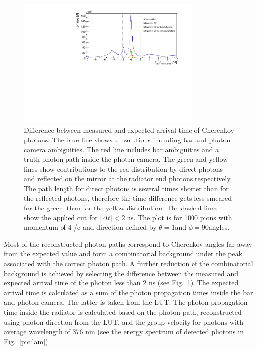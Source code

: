 \begin{figure}[!h]
\centering
\includegraphics[width=0.8\textwidth]{pics/hDiff.pdf}
\caption{\label{pic:dtime}
Difference between measured and expected arrival time of Cherenkov photons. The blue line shows all solutions including bar and photon camera ambiguities. The red line includes bar ambiguities and a truth photon path inside the photon camera. The green and yellow lines show contributions to the red distribution by direct photons and reflected on the mirror at the radiator end photons respectively. The path length for direct photons is several times shorter than for the reflected photons, therefore the time difference gets less smeared for the green, than for the yellow distribution. The dashed lines show the applied cut for $|\Delta t| < 2$ ns. The plot is for 1000 pions with momentum of 4 \gev/c and direction defined by $\theta = 1$\mydeg and $\phi = 90$\mydeg angles.
}
\end{figure}

Most of the reconstructed photon paths correspond to Cherenkov angles far away from the expected value and form a combinatorial background under the peak associated with the correct photon path. A further reduction of the combinatorial background is achieved by selecting the difference between the measured and expected arrival time of the photon less than 2 ns (see Fig.~\ref{pic:dtime}). The expected arrival time is calculated as a sum of the photon propagation times inside the bar and photon camera. The latter is taken from the LUT. The photon propagation time inside the radiator is calculated based on the photon path, reconstructed using photon direction from the LUT, and the group velocity for photons with average wavelength of $376$ nm (see the energy spectrum of detected photons in Fig.~\ref{pic:lam}).

